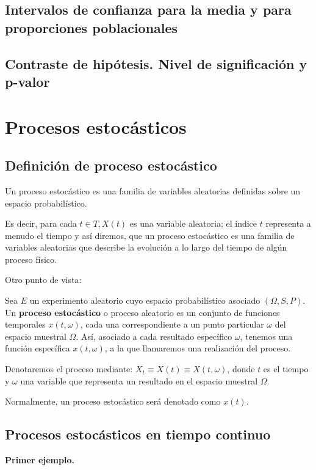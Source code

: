 \documentclass[a4paper]{book}
\begin{document}
\section{Intervalos de confianza para la media y para proporciones poblacionales}

\section{Contraste de hipótesis. Nivel de significación y p-valor}



\chapter{Procesos estocásticos}

\section{Definición de proceso estocástico}
Un proceso estocástico es una familia de variables aleatorias definidas sobre un espacio probabilístico.

Es decir, para cada $ t\in T, X(t)$ es una variable aleatoria; el índice $t$ representa a menudo el tiempo y así diremos, que un proceso estocástico es una familia de variables aleatorias que describe la evolución a lo largo del tiempo de algún proceso físico.

Otro punto de vista:

Sea $E$ un experimento aleatorio cuyo espacio probabilístico asociado $(\Omega , S, P)$. Un \textbf{proceso estocástico} o proceso aleatorio es un conjunto de funciones temporales $x(t,\omega )$, cada una correspondiente a un punto particular $\omega$ del espacio muestral $\Omega$. Así, asociado a cada resultado específico $\omega$, tenemos una función específica $x(t,\omega )$, a la que llamaremos una realización del proceso.

Denotaremos el proceso mediante: $X_t\equiv X(t) \equiv X(t,\omega )$, donde $t$ es el tiempo y $\omega$ una variable que representa un resultado en el espacio muestral $\Omega$.

Normalmente, un proceso estocástico será denotado como $x(t)$.

\section{Procesos estocásticos en tiempo continuo}
\textbf{Primer ejemplo.}
\end{document}
